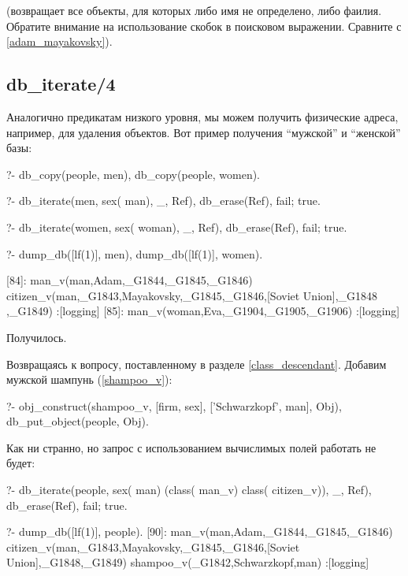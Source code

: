 \documentclass[a4paper]{book}
\begin{document}
(возвращает все объекты, для которых либо имя не определено, либо
фаилия. Обратите внимание на использование скобок в поисковом
выражении. Сравните с \ref{adam_mayakovsky}).

\subsection{db\_iterate/4}

Аналогично предикатам низкого уровня, мы можем получить
физические адреса, например, для удаления объектов. Вот пример
получения ``мужской'' и ``женской'' базы:

\begin{example}{}{}
?- db_copy(people, men), db_copy(people, women).

?- db_iterate(men, sex(\+ man), _, Ref), %
   db_erase(Ref), fail; true.

?- db_iterate(women, sex(\+ woman), _, Ref), %
   db_erase(Ref), fail; true.

?- dump_db([lf(1)], men), dump_db([lf(1)], women).

[84]: man_v(man,Adam,_G1844,_G1845,_G1846) 
citizen_v(man,_G1843,Mayakovsky,_G1845,_G1846,[Soviet Union],_G1848
,_G1849)                                                          
 :[logging]
[85]: man_v(woman,Eva,_G1904,_G1905,_G1906) 
 :[logging]
\end{example}

Получилось.

Возвращаясь к вопросу, поставленному в разделе
\ref{class_descendant}. Добавим мужской шампунь (\ref{shampoo_v}):

\begin{example}{}{}
?- obj_construct(shampoo_v, [firm, sex], 
                 ['Schwarzkopf', man], Obj),
    db_put_object(people, Obj).
\end{example}

Как ни странно, но запрос с использованием вычислимых полей
работать не будет:

\begin{example}{}{}
?- db_iterate(people, 
      sex(\+ man) \/ (class(\+ man_v) \/ class(\+ citizen_v)), 
      _, Ref), 
   db_erase(Ref), fail; true.                    

?- dump_db([lf(1)], people).
[90]: man_v(man,Adam,_G1844,_G1845,_G1846) 
citizen_v(man,_G1843,Mayakovsky,_G1845,_G1846,[Soviet Union],_G1848,_G1849)                                                          
shampoo_v(_G1842,Schwarzkopf,man) 
 :[logging]
\end{example}
\end{document}
